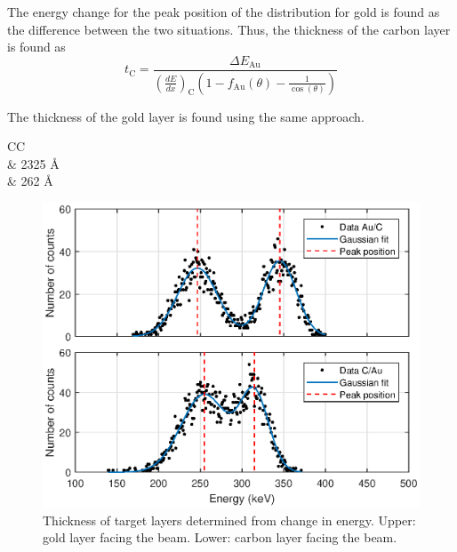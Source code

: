 The energy change for the peak position of the distribution for gold is found as the difference between the two situations. Thus, the thickness of the carbon layer is found as 
\begin{equation}
t_\mathrm{C} = \frac{\Delta E_{\mathrm{Au}}}{\left(\frac{dE}{dx}\right)_\mathrm{C} \left(1 - f_\mathrm{Au}(\theta) - \frac{1}{\cos(\theta)} \right)}
\end{equation}


The thickness of the gold layer is found using the same approach. 

\begin{table}[h]
\centering
\caption{Thickness of the target layers determined from change in energy.}
\begin{tabular}{CC}
\toprule
{}\\
\midrule
{} & 2325  \; \AA \\
 & 262  \; \AA \\
\bottomrule
\end{tabular}

\label{tab_thickness}
\end{table}




\begin{figure}[t]
\centering
\includegraphics[width=0.99\columnwidth]{Dterminethicknessplot.eps}
\caption{Thickness of target layers determined from change in energy. Upper: gold layer facing the beam. Lower: carbon layer facing the beam.}
\label{fig_thickness}
\end{figure}



